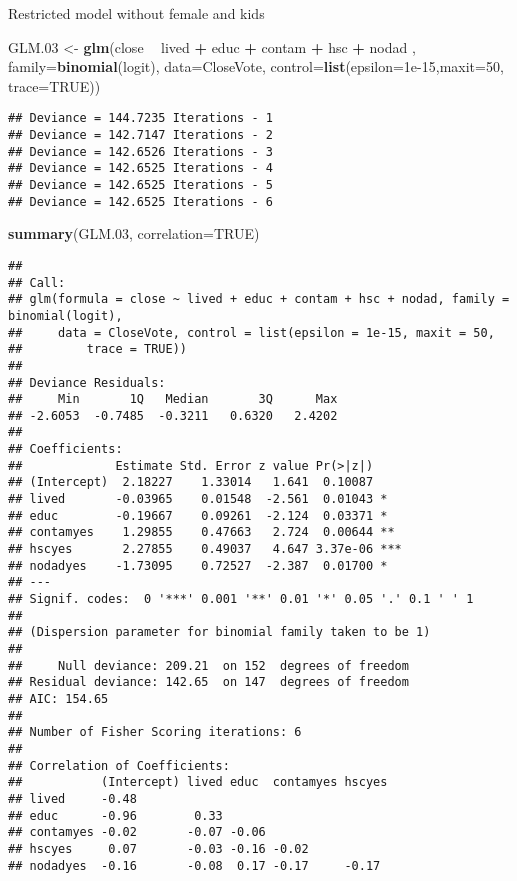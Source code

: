 \documentclass[
]{article}
\newenvironment{Shaded}{\begin{snugshade}}{\end{snugshade}}
\newcommand{\DataTypeTok}[1]{\textcolor[rgb]{0.13,0.29,0.53}{#1}}
\newcommand{\DecValTok}[1]{\textcolor[rgb]{0.00,0.00,0.81}{#1}}
\newcommand{\FloatTok}[1]{\textcolor[rgb]{0.00,0.00,0.81}{#1}}
\newcommand{\KeywordTok}[1]{\textcolor[rgb]{0.13,0.29,0.53}{\textbf{#1}}}
\newcommand{\NormalTok}[1]{#1}
\newcommand{\OperatorTok}[1]{\textcolor[rgb]{0.81,0.36,0.00}{\textbf{#1}}}
\newcommand{\OtherTok}[1]{\textcolor[rgb]{0.56,0.35,0.01}{#1}}
\newcommand{\StringTok}[1]{\textcolor[rgb]{0.31,0.60,0.02}{#1}}
\begin{document}
Restricted model without female and kids

\begin{Shaded}
\begin{Highlighting}[]
\NormalTok{GLM}\FloatTok{.03}\NormalTok{ <-}\StringTok{ }\KeywordTok{glm}\NormalTok{(close }\OperatorTok{~}\StringTok{ }\NormalTok{lived }\OperatorTok{+}\StringTok{ }\NormalTok{educ }\OperatorTok{+}\StringTok{ }\NormalTok{contam }\OperatorTok{+}\StringTok{ }\NormalTok{hsc }\OperatorTok{+}\StringTok{ }\NormalTok{nodad ,}
             \DataTypeTok{family=}\KeywordTok{binomial}\NormalTok{(logit), }\DataTypeTok{data=}\NormalTok{CloseVote,}
             \DataTypeTok{control=}\KeywordTok{list}\NormalTok{(}\DataTypeTok{epsilon=}\FloatTok{1e-15}\NormalTok{,}\DataTypeTok{maxit=}\DecValTok{50}\NormalTok{, }\DataTypeTok{trace=}\OtherTok{TRUE}\NormalTok{))}
\end{Highlighting}
\end{Shaded}

\begin{verbatim}
## Deviance = 144.7235 Iterations - 1
## Deviance = 142.7147 Iterations - 2
## Deviance = 142.6526 Iterations - 3
## Deviance = 142.6525 Iterations - 4
## Deviance = 142.6525 Iterations - 5
## Deviance = 142.6525 Iterations - 6
\end{verbatim}

\begin{Shaded}
\begin{Highlighting}[]
\KeywordTok{summary}\NormalTok{(GLM}\FloatTok{.03}\NormalTok{, }\DataTypeTok{correlation=}\OtherTok{TRUE}\NormalTok{)}
\end{Highlighting}
\end{Shaded}

\begin{verbatim}
## 
## Call:
## glm(formula = close ~ lived + educ + contam + hsc + nodad, family = binomial(logit), 
##     data = CloseVote, control = list(epsilon = 1e-15, maxit = 50, 
##         trace = TRUE))
## 
## Deviance Residuals: 
##     Min       1Q   Median       3Q      Max  
## -2.6053  -0.7485  -0.3211   0.6320   2.4202  
## 
## Coefficients:
##             Estimate Std. Error z value Pr(>|z|)    
## (Intercept)  2.18227    1.33014   1.641  0.10087    
## lived       -0.03965    0.01548  -2.561  0.01043 *  
## educ        -0.19667    0.09261  -2.124  0.03371 *  
## contamyes    1.29855    0.47663   2.724  0.00644 ** 
## hscyes       2.27855    0.49037   4.647 3.37e-06 ***
## nodadyes    -1.73095    0.72527  -2.387  0.01700 *  
## ---
## Signif. codes:  0 '***' 0.001 '**' 0.01 '*' 0.05 '.' 0.1 ' ' 1
## 
## (Dispersion parameter for binomial family taken to be 1)
## 
##     Null deviance: 209.21  on 152  degrees of freedom
## Residual deviance: 142.65  on 147  degrees of freedom
## AIC: 154.65
## 
## Number of Fisher Scoring iterations: 6
## 
## Correlation of Coefficients:
##           (Intercept) lived educ  contamyes hscyes
## lived     -0.48                                   
## educ      -0.96        0.33                       
## contamyes -0.02       -0.07 -0.06                 
## hscyes     0.07       -0.03 -0.16 -0.02           
## nodadyes  -0.16       -0.08  0.17 -0.17     -0.17
\end{verbatim}
\end{document}
